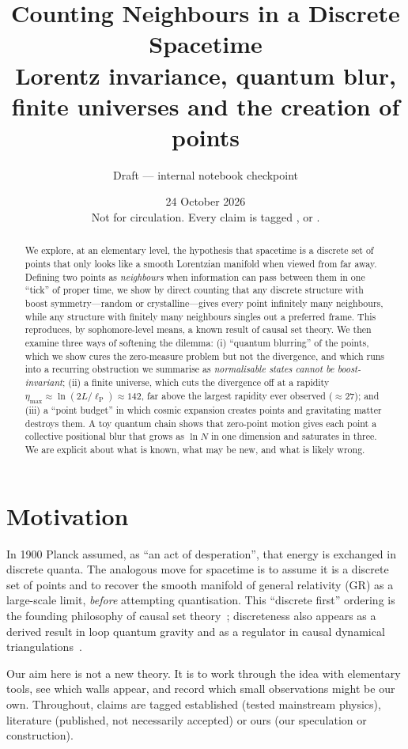 \documentclass[11pt,a4paper]{article}
\title{Counting Neighbours in a Discrete Spacetime\\[4pt]
\large Lorentz invariance, quantum blur, finite universes and the creation of points}
\author{Draft --- internal notebook checkpoint}
\date{24 October 2026 \\[2pt] \small Not for circulation. Every claim is tagged \est, \lit{} or \ours.}
\newcommand{\tagbox}[2]{\textsf{\scriptsize\colorbox{#1!12}{\textcolor{#1!70!black}{#2}}}}
\newcommand{\est}{\tagbox{gray}{established}}
\newcommand{\lit}{\tagbox{blue}{literature}}
\newcommand{\ours}{\tagbox{orange}{ours}}
\newcommand{\lP}{\ell_{\mathrm P}}
\begin{document}
\maketitle

\begin{abstract}
We explore, at an elementary level, the hypothesis that spacetime is a discrete set of points that only looks like a smooth Lorentzian manifold when viewed from far away. Defining two points as \emph{neighbours} when information can pass between them in one ``tick'' of proper time, we show by direct counting that any discrete structure with boost symmetry---random or crystalline---gives every point infinitely many neighbours, while any structure with finitely many neighbours singles out a preferred frame. This reproduces, by sophomore-level means, a known result of causal set theory. We then examine three ways of softening the dilemma: (i) ``quantum blurring'' of the points, which we show cures the zero-measure problem but not the divergence, and which runs into a recurring obstruction we summarise as \emph{normalisable states cannot be boost-invariant}; (ii) a finite universe, which cuts the divergence off at a rapidity $\eta_{\max}\approx\ln(2L/\lP)\approx 142$, far above the largest rapidity ever observed ($\approx 27$); and (iii) a ``point budget'' in which cosmic expansion creates points and gravitating matter destroys them. A toy quantum chain shows that zero-point motion gives each point a collective positional blur that grows as $\ln N$ in one dimension and saturates in three. We are explicit about what is known, what may be new, and what is likely wrong.
\end{abstract}

\section{Motivation}
In 1900 Planck assumed, as ``an act of desperation'', that energy is exchanged in discrete quanta. The analogous move for spacetime is to assume it is a discrete set of points and to recover the smooth manifold of general relativity (GR) as a large-scale limit, \emph{before} attempting quantisation. This ``discrete first'' ordering is the founding philosophy of causal set theory~\cite{BLMS87}; discreteness also appears as a derived result in loop quantum gravity and as a regulator in causal dynamical triangulations~\cite{AJL05}.

Our aim here is not a new theory. It is to work through the idea with elementary tools, see which walls appear, and record which small observations might be our own. Throughout, claims are tagged \est{} (tested mainstream physics), \lit{} (published, not necessarily accepted) or \ours{} (our speculation or construction).
\end{document}
